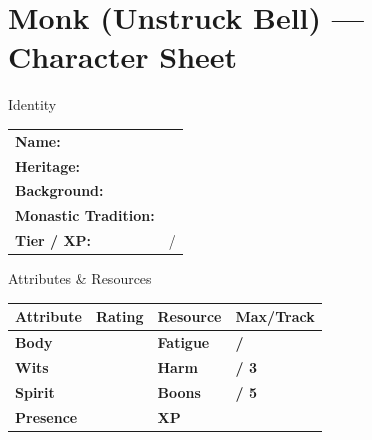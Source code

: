 \documentclass[10pt]{article}
\begin{document}
\newpage

\section*{Monk (Unstruck Bell) --- Character Sheet}

\begin{minipage}[t]{0.48\linewidth}
    \begin{charbox}{Identity}
        \begin{tabular}{p{2.5cm} p{5cm}}
            \textbf{Name:} & \underline{\hspace{4cm}} \\
            \textbf{Heritage:} & \underline{\hspace{4cm}} \\
            \textbf{Background:} & \underline{\hspace{4cm}} \\
            \textbf{Monastic Tradition:} & \underline{\hspace{4cm}} \\
            \textbf{Tier / XP:} & \underline{\hspace{2cm}} / \underline{\hspace{2cm}} \\
        \end{tabular}
    \end{charbox}
    
    \vspace{0.5em}
    
    \begin{charbox}{Attributes \& Resources}
        \begin{tabular}{>{\bfseries}p{2.5cm} >{\bfseries}p{1.5cm} >{\bfseries}p{2.5cm} >{\bfseries}p{1.5cm}}
            \toprule
            \textbf{Attribute} & \textbf{Rating} & \textbf{Resource} & \textbf{Max/Track} \\
            \midrule
            Body & \underline{\hspace{1.5cm}} & Fatigue & \underline{\hspace{1.5cm}} / \underline{\hspace{1.5cm}} \\
            Wits & \underline{\hspace{1.5cm}} & Harm & \underline{\hspace{1.5cm}} / 3 \\
            Spirit & \underline{\hspace{1.5cm}} & Boons & \underline{\hspace{1.5cm}} / 5 \\
            Presence & \underline{\hspace{1.5cm}} & XP & \underline{\hspace{1.5cm}} \\
            \bottomrule
        \end{tabular}
    \end{charbox}
    

\end{minipage}
\end{document}
